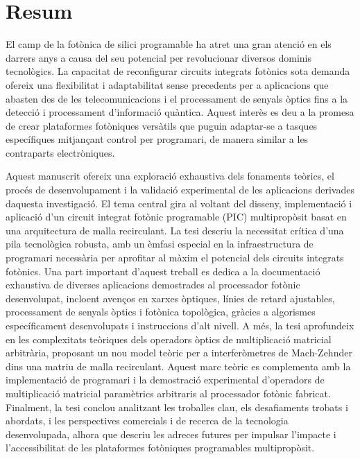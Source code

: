 \chapter*{Resum}

El camp de la fotònica de silici programable ha atret una gran atenció en els darrers anys a causa del seu potencial per revolucionar diversos dominis tecnològics.
La capacitat de reconfigurar circuits integrats fotònics sota demanda ofereix una flexibilitat i adaptabilitat sense precedents per a aplicacions que abasten des de les telecomunicacions i el processament de senyals òptics fins a la detecció i processament d'informació quàntica.
Aquest interès es deu a la promesa de crear plataformes fotòniques versàtils que puguin adaptar-se a tasques específiques mitjançant control per programari, de manera similar a les contraparts electròniques.

Aquest manuscrit ofereix una exploració exhaustiva dels fonaments teòrics, el procés de desenvolupament i la validació experimental de les aplicacions derivades daquesta investigació.
El tema central gira al voltant del disseny, implementació i aplicació d'un circuit integrat fotònic programable (PIC) multipropòsit basat en una arquitectura de malla recirculant.
La tesi descriu la necessitat crítica d'una pila tecnològica robusta, amb un èmfasi especial en la infraestructura de programari necessària per aprofitar al màxim el potencial dels circuits integrats fotònics.
Una part important d'aquest treball es dedica a la documentació exhaustiva de diverses aplicacions demostrades al processador fotònic desenvolupat, incloent avenços en xarxes òptiques, línies de retard ajustables, processament de senyals òptics i fotònica topològica, gràcies a algorismes específicament desenvolupats i instruccions d'alt nivell.
A més, la tesi aprofundeix en les complexitats teòriques dels operadors òptics de multiplicació matricial arbitrària, proposant un nou model teòric per a interferòmetres de Mach-Zehnder dins una matriu de malla recirculant.
Aquest marc teòric es complementa amb la implementació de programari i la demostració experimental d'operadors de multiplicació matricial paramètrics arbitraris al processador fotònic fabricat.
Finalment, la tesi conclou analitzant les troballes clau, els desafiaments trobats i abordats, i les perspectives comercials i de recerca de la tecnologia desenvolupada, alhora que descriu les adreces futures per impulsar l'impacte i l'accessibilitat de les plataformes fotòniques programables multipropòsit.

